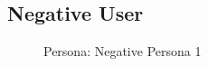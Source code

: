 \documentclass[a4paper,12pt]{report}
\begin{document}
\subsection{Negative User}
\begin{figure}[!htb]
	\caption{\label{fig:negative_persona_1}Persona: Negative Persona 1}	
\end{figure}

\FloatBarrier
\end{document}
